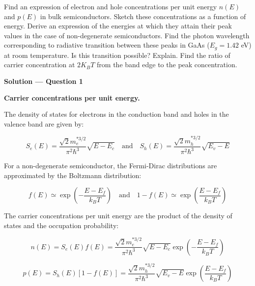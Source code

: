 
\begin{question}[Question 1]
Find an expression of electron and hole concentrations per unit energy $n(E)$ and $p(E)$ in bulk semiconductors. Sketch these concentrations as a function of energy. Derive an expression of the energies at which they attain their peak values in the case of non-degenerate semiconductors. Find the photon wavelength corresponding to radiative transition between these peaks in GaAs ($E_g = 1.42$ eV) at room temperature. Is this transition possible? Explain. Find the ratio of carrier concentration at $2K_BT$ from the band edge to the peak concentration.
\end{question}

\textbf{\large Solution --- Question 1}

\textbf{Carrier concentrations per unit energy.}

The density of states for electrons in the conduction band and holes in the valence band are given by:

\begin{equation*}
  S_e(E) = \frac{\sqrt{2} m_e^{* 3/2}}{\pi^2 \hbar^3} \sqrt{E - E_c} \quad \text{and} \quad S_h(E) = \frac{\sqrt{2} m_h^{* 3/2}}{\pi^2 \hbar^3} \sqrt{E_v - E}
\end{equation*}

For a non-degenerate semiconductor, the Fermi-Dirac distributions are approximated by the Boltzmann distribution:

\begin{equation*}
  f(E) \simeq \exp\left(-\frac{E-E_f}{k_B T}\right) \quad \text{and} \quad 1-f(E) \simeq \exp\left(\frac{E-E_f}{k_B T}\right)
\end{equation*}

The carrier concentrations per unit energy are the product of the density of states and the occupation probability:

\begin{equation*}
  \boxed{n(E) = S_e(E) f(E) = \frac{\sqrt{2} m_e^{* 3/2}}{\pi^2 \hbar^3} \sqrt{E - E_c} \exp\left(-\frac{E-E_f}{k_B T}\right)}
\end{equation*}

\begin{equation*}
  \boxed{p(E) = S_h(E) [1-f(E)] = \frac{\sqrt{2} m_h^{* 3/2}}{\pi^2 \hbar^3} \sqrt{E_v - E} \exp\left(\frac{E-E_f}{k_B T}\right)}
\end{equation*}

